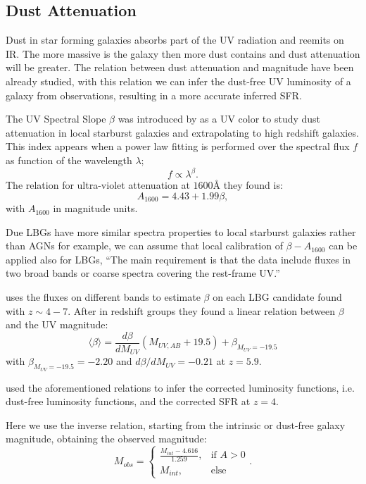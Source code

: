 \documentclass{emulateapj}
\begin{document}
\subsection{Dust Attenuation}
 
Dust in star forming galaxies absorbs part of the UV radiation and reemits on IR. The more 
massive is the galaxy then more dust contains and dust attenuation will be greater. The 
relation between dust attenuation and magnitude have been already studied, with this relation 
we can infer the dust-free UV luminosity of a galaxy from observations, resulting in  a more 
accurate inferred SFR.

The UV Spectral Slope $\beta$ was introduced by \citet{meurer99} as a UV color to 
study dust attenuation in local starburst galaxies and extrapolating to high redshift galaxies. 
This index appears when a power law fitting is performed over the spectral flux $f$ 
as function of the wavelength $\lambda$;
\[ f \propto \lambda^\beta.\]
The relation for ultra-violet attenuation at $1600 \textrm{\AA}$ they found is:
\begin{equation}
A_{1600} = 4.43 + 1.99 \beta,
\end{equation}
with $A_{1600}$ in magnitude units. 

Due LBGs have more similar spectra properties to local starburst galaxies rather than AGNs 
for example, we can assume that local calibration of $\beta-A_{1600}$ can be applied also 
for LBGs,
``The main requirement is that the data include fluxes in two broad bands or coarse spectra 
covering the rest-frame UV.''


\citet{bouwens12b} uses the fluxes on different bands to estimate $\beta$ on each LBG 
candidate found with $z \sim 4-7$. After in redshift groups they found a linear relation 
between $\beta$ and the UV magnitude:
\begin{equation}
\langle \beta \rangle = \frac{d \beta}{d M_{UV}} \left( M_{UV,AB}+19.5 \right) 
                                   + \beta_{M_{UV}=-19.5}
\end{equation}
with $ \beta_{M_{UV}=-19.5} = -2.20$ and $d \beta/d M_{UV} = -0.21$ at $z=5.9$.

\citet{smit12} used the aforementioned relations to infer the corrected luminosity functions,
i.e. dust-free luminosity functions, and the corrected SFR at $z=4$. 

Here we use the inverse relation, starting from the intrinsic or dust-free galaxy magnitude, 
obtaining the observed magnitude:
\begin{equation}
  M_{obs} = \begin{cases} 
                         \frac{M_{int}-4.616}{1.259}, &\mbox{if } A>0 \\
                         M_{int}, &\mbox{else}
                   \end{cases}.
\label{eqn. dust attenuation}
\end{equation}
\end{document}
